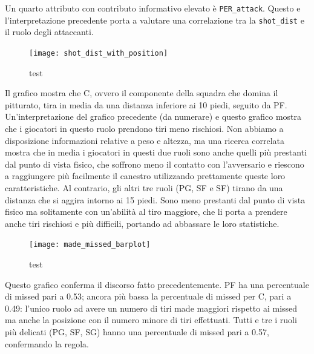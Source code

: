 \par
Un quarto attributo con contributo informativo elevato è \texttt{PER\_attack}. Questo e l'interpretazione precedente porta a valutare una correlazione tra la \texttt{shot\_dist} e il ruolo degli attaccanti.

\begin{figure}
\caption{test}
\fontsize{9pt}{1em}
	\texttt{[image: shot\_dist\_with\_position]}
\end{figure}

Il grafico mostra che C, ovvero il componente della squadra che domina il pitturato, tira in media da una distanza inferiore ai 10 piedi, seguito da PF. Un'interpretazione del grafico precedente (da numerare) e questo grafico mostra che i giocatori in questo ruolo prendono tiri meno rischiosi. Non abbiamo a disposizione informazioni relative a peso e altezza, ma una ricerca correlata mostra che in media i giocatori in questi due ruoli sono anche quelli più prestanti dal punto di vista fisico, che soffrono meno il contatto con l'avversario e riescono a raggiungere più facilmente il canestro utilizzando prettamente queste loro caratteristiche.
Al contrario, gli altri tre ruoli (PG, SF e SF) tirano da una distanza che si aggira intorno ai 15 piedi. Sono meno prestanti dal punto di vista fisico ma solitamente con un'abilità al tiro maggiore, che li porta a prendere anche tiri rischiosi e più difficili, portando ad abbassare le loro statistiche.

\begin{figure}
\caption{test}
\fontsize{9pt}{1em}
	\texttt{[image: made\_missed\_barplot]}
\end{figure}

Questo grafico conferma il discorso fatto precedentemente. PF ha una percentuale di missed pari a 0.53; ancora più bassa la percentuale di missed per C, pari a 0.49: l'unico ruolo ad avere un numero di tiri made maggiori rispetto ai missed ma anche la posizione con il numero minore di tiri effettuati.
Tutti e tre i ruoli più delicati (PG, SF, SG) hanno una percentuale di missed pari a 0.57, confermando la regola.






